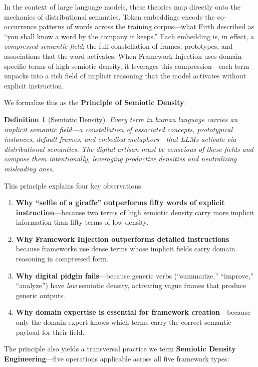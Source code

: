 \documentclass[12pt,a4paper]{article}
\newtheorem{definition}{Definition}[section]
\begin{document}
In the context of large language models, these theories map directly onto the mechanics of distributional semantics. Token embeddings encode the co-occurrence patterns of words across the training corpus---what Firth \citeyearpar{firth1957synopsis} described as ``you shall know a word by the company it keeps.'' Each embedding is, in effect, a \emph{compressed semantic field}: the full constellation of frames, prototypes, and associations that the word activates. When Framework Injection uses domain-specific terms of high semiotic density, it leverages this compression---each term unpacks into a rich field of implicit reasoning that the model activates without explicit instruction.

We formalize this as the \textbf{Principle of Semiotic Density}:

\begin{definition}[Semiotic Density]
Every term in human language carries an implicit semantic field---a constellation of associated concepts, prototypical instances, default frames, and embodied metaphors---that LLMs activate via distributional semantics. The digital artisan must be conscious of these fields and compose them intentionally, leveraging productive densities and neutralizing misleading ones.
\end{definition}

This principle explains four key observations:

\begin{enumerate}
    \item \textbf{Why ``selfie of a giraffe'' outperforms fifty words of explicit instruction}---because two terms of high semiotic density carry more implicit information than fifty terms of low density.
    \item \textbf{Why Framework Injection outperforms detailed instructions}---because frameworks use dense terms whose implicit fields carry domain reasoning in compressed form.
    \item \textbf{Why digital pidgin fails}---because generic verbs (``summarize,'' ``improve,'' ``analyze'') have \emph{low} semiotic density, activating vague frames that produce generic outputs.
    \item \textbf{Why domain expertise is essential for framework creation}---because only the domain expert knows which terms carry the correct semantic payload for their field.
\end{enumerate}

The principle also yields a transversal practice we term \textbf{Semiotic Density Engineering}---five operations applicable across all five framework types:
\end{document}

